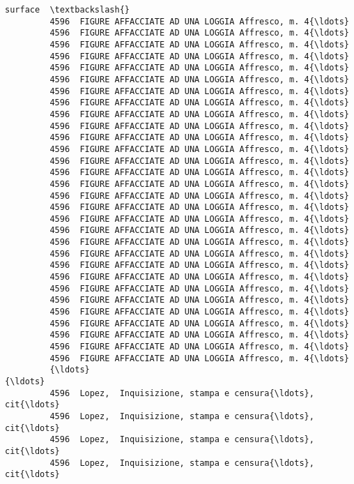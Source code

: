 \documentclass[11pt]{article}
\begin{document}
\begin{Verbatim}[commandchars=\\\{\}]
                                                         surface  \textbackslash{}
         4596  FIGURE AFFACCIATE AD UNA LOGGIA Affresco, m. 4{\ldots}   
         4596  FIGURE AFFACCIATE AD UNA LOGGIA Affresco, m. 4{\ldots}   
         4596  FIGURE AFFACCIATE AD UNA LOGGIA Affresco, m. 4{\ldots}   
         4596  FIGURE AFFACCIATE AD UNA LOGGIA Affresco, m. 4{\ldots}   
         4596  FIGURE AFFACCIATE AD UNA LOGGIA Affresco, m. 4{\ldots}   
         4596  FIGURE AFFACCIATE AD UNA LOGGIA Affresco, m. 4{\ldots}   
         4596  FIGURE AFFACCIATE AD UNA LOGGIA Affresco, m. 4{\ldots}   
         4596  FIGURE AFFACCIATE AD UNA LOGGIA Affresco, m. 4{\ldots}   
         4596  FIGURE AFFACCIATE AD UNA LOGGIA Affresco, m. 4{\ldots}   
         4596  FIGURE AFFACCIATE AD UNA LOGGIA Affresco, m. 4{\ldots}   
         4596  FIGURE AFFACCIATE AD UNA LOGGIA Affresco, m. 4{\ldots}   
         4596  FIGURE AFFACCIATE AD UNA LOGGIA Affresco, m. 4{\ldots}   
         4596  FIGURE AFFACCIATE AD UNA LOGGIA Affresco, m. 4{\ldots}   
         4596  FIGURE AFFACCIATE AD UNA LOGGIA Affresco, m. 4{\ldots}   
         4596  FIGURE AFFACCIATE AD UNA LOGGIA Affresco, m. 4{\ldots}   
         4596  FIGURE AFFACCIATE AD UNA LOGGIA Affresco, m. 4{\ldots}   
         4596  FIGURE AFFACCIATE AD UNA LOGGIA Affresco, m. 4{\ldots}   
         4596  FIGURE AFFACCIATE AD UNA LOGGIA Affresco, m. 4{\ldots}   
         4596  FIGURE AFFACCIATE AD UNA LOGGIA Affresco, m. 4{\ldots}   
         4596  FIGURE AFFACCIATE AD UNA LOGGIA Affresco, m. 4{\ldots}   
         4596  FIGURE AFFACCIATE AD UNA LOGGIA Affresco, m. 4{\ldots}   
         4596  FIGURE AFFACCIATE AD UNA LOGGIA Affresco, m. 4{\ldots}   
         4596  FIGURE AFFACCIATE AD UNA LOGGIA Affresco, m. 4{\ldots}   
         4596  FIGURE AFFACCIATE AD UNA LOGGIA Affresco, m. 4{\ldots}   
         4596  FIGURE AFFACCIATE AD UNA LOGGIA Affresco, m. 4{\ldots}   
         4596  FIGURE AFFACCIATE AD UNA LOGGIA Affresco, m. 4{\ldots}   
         4596  FIGURE AFFACCIATE AD UNA LOGGIA Affresco, m. 4{\ldots}   
         4596  FIGURE AFFACCIATE AD UNA LOGGIA Affresco, m. 4{\ldots}   
         4596  FIGURE AFFACCIATE AD UNA LOGGIA Affresco, m. 4{\ldots}   
         4596  FIGURE AFFACCIATE AD UNA LOGGIA Affresco, m. 4{\ldots}   
         {\ldots}                                                 {\ldots}   
         4596  Lopez,  Inquisizione, stampa e censura{\ldots}, cit{\ldots}   
         4596  Lopez,  Inquisizione, stampa e censura{\ldots}, cit{\ldots}   
         4596  Lopez,  Inquisizione, stampa e censura{\ldots}, cit{\ldots}   
         4596  Lopez,  Inquisizione, stampa e censura{\ldots}, cit{\ldots}   

\end{Verbatim}
\end{document}
